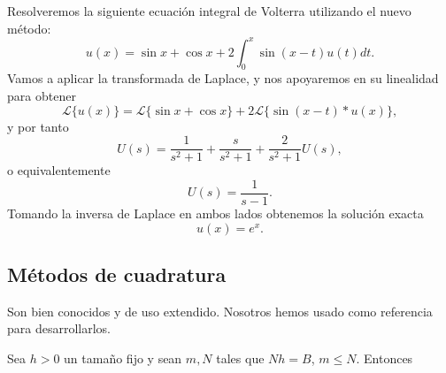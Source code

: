 \begin{ejemplo}
	Resolveremos la siguiente ecuación integral de Volterra utilizando el nuevo método:
	\begin{equation}
		u(x) = \sin x + \cos x + 2 \int_{0}^{x} \sin (x-t)u(t)dt.
	\end{equation}
	Vamos a aplicar la transformada de Laplace, y nos apoyaremos en su linealidad para obtener
	\begin{equation}
		\mathcal{L}\{u(x)\} = \mathcal{L}\{\sin x + \cos x\} + 2\mathcal{L}\{\sin (x-t) \ast u(x)\},
	\end{equation}
	y por tanto
	\begin{equation}
		U(s) = \dfrac{1}{s^2+1}+\dfrac{s}{s^2+1}+\dfrac{2}{s^2+1}U(s),
	\end{equation}
	o equivalentemente
	\begin{equation}
		U(s) = \dfrac{1}{s-1}.
	\end{equation}
	Tomando la inversa de Laplace en ambos lados obtenemos la solución exacta
	\begin{equation}
		u(x) = e^x.
	\end{equation}
\end{ejemplo}
\subsection{Métodos de cuadratura}
Son bien conocidos y de uso extendido. Nosotros hemos usado como referencia \cite{cuadratura} para desarrollarlos.

Sea $h > 0$ un tamaño fijo y sean $m, N$ tales que $Nh = B$, $m \leqslant N$. Entonces

